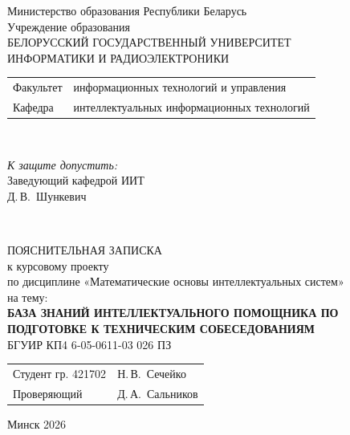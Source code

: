 \begin{titlepage}
  \begin{center}
    Министерство образования Республики Беларусь\\[1em]
    Учреждение образования\\
    БЕЛОРУССКИЙ ГОСУДАРСТВЕННЫЙ УНИВЕРСИТЕТ \\
    ИНФОРМАТИКИ И РАДИОЭЛЕКТРОНИКИ\\[1em]

    \begin{minipage}{\textwidth}
      \begin{flushleft}
        \begin{tabular}{ l l }
          Факультет & информационных технологий и управления\\
          Кафедра   & интеллектуальных информационных технологий
        \end{tabular}
      \end{flushleft}
    \end{minipage}\\[1em]

    \begin{flushright}
      \begin{minipage}{0.4\textwidth}
        \textit{К защите допустить:}\\[0.8em]
        Заведующий кафедрой ИИТ\\[0.45em]
        \underline{\hspace*{2.8cm}} Д.\,В.~Шункевич
      \end{minipage}\\[2.2em]
    \end{flushright}

    {ПОЯСНИТЕЛЬНАЯ ЗАПИСКА}\\
    {к курсовому проекту}\\
    {по дисциплине «Математические основы интеллектуальных систем»}\\
    {на тему:}\\[1em]
    \textbf{\large БАЗА ЗНАНИЙ ИНТЕЛЛЕКТУАЛЬНОГО ПОМОЩНИКА ПО ПОДГОТОВКЕ К ТЕХНИЧЕСКИМ СОБЕСЕДОВАНИЯМ}\\[1em]


    {БГУИР КП4 6‑05-0611-03 026 ПЗ}\\[2em]
    \vspace{2em}
    \begin{tabular}{ p{}p{} }
      Студент гр. 421702 & Н.\,В.~Сечейко \\
      Проверяющий & Д.\,А.~Сальников \\
    \end{tabular}
    
    \vfill
    {\normalsize Минск 2026}
  \end{center}
\end{titlepage}

